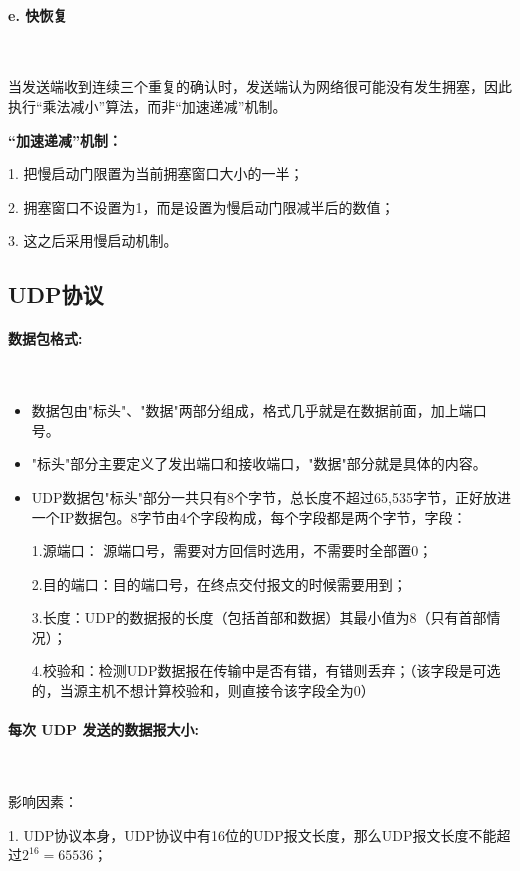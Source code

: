 \documentclass[UTF8]{article}%
\begin{document}
\paragraph{e. 快恢复}~{}

当发送端收到连续三个重复的确认时，发送端认为网络很可能没有发生拥塞，因此执行“乘法减小”算法，而非“加速递减”机制。

\textbf{“加速递减”机制：}

1. 把慢启动门限置为当前拥塞窗口大小的一半；

2. 拥塞窗口不设置为1，而是设置为慢启动门限减半后的数值；

3. 这之后采用慢启动机制。

\subsection{UDP协议}

\paragraph{数据包格式:}~{}

\begin{itemize}
    
    \item 数据包由"标头"、"数据"两部分组成，格式几乎就是在数据前面，加上端口号。
    \item "标头"部分主要定义了发出端口和接收端口，"数据"部分就是具体的内容。
    \item UDP数据包"标头"部分一共只有8个字节，总长度不超过65,535字节，正好放进一个IP数据包。8字节由4个字段构成，每个字段都是两个字节，字段：
    
    1.源端口： 源端口号，需要对方回信时选用，不需要时全部置0；

    2.目的端口：目的端口号，在终点交付报文的时候需要用到；

    3.长度：UDP的数据报的长度（包括首部和数据）其最小值为8（只有首部情况）；

    4.校验和：检测UDP数据报在传输中是否有错，有错则丢弃；（该字段是可选的，当源主机不想计算校验和，则直接令该字段全为0）
\end{itemize}

\paragraph{每次 UDP 发送的数据报大小:}~{}

影响因素：

1. UDP协议本身，UDP协议中有16位的UDP报文长度，那么UDP报文长度不能超过$2^16=65536$；
\end{document}
